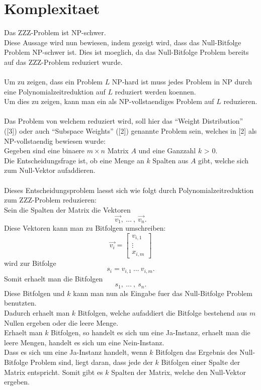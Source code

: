 \documentclass[a4paper,10pt,ngerman]{scrartcl}
\begin{document}
\section{Komplexitaet}
Das ZZZ-Problem ist NP-schwer.\\
Diese Aussage wird nun bewiesen, indem gezeigt wird, dass das Null-Bitfolge Problem NP-schwer ist. Dies ist moeglich, da das Null-Bitfolge Problem bereits auf das ZZZ-Problem reduziert wurde.
\\
\\Um zu zeigen, dass ein Problem $L$ NP-hard ist muss jedes Problem in NP durch eine Polynomialzeitreduktion auf $L$ reduziert werden koennen.
\\Um dies zu zeigen, kann man ein als NP-vollstaendiges Problem auf $L$ reduzieren.\\
\\
Das Problem von welchem reduziert wird, soll hier das "`Weight Distribution"' ([3]) oder auch "`Subspace Weights"' ([2]) genannte Problem sein, welches in [2] als NP-vollstaendig bewiesen wurde:\\
Gegeben sind eine binaere $m \times n$  Matrix $A$ und eine Ganzzahl $k$ > 0.\\
Die Entscheidungsfrage ist, ob eine Menge an $k$ Spalten aus $A$ gibt, welche sich zum Null-Vektor aufaddieren.
\\\\
Dieses Entscheidungsproblem laesst sich wie folgt durch Polynomialzeitreduktion zum ZZZ-Problem reduzieren:\\
Sein die Spalten der Matrix die Vektoren
$$
\vec{v_1}, \ \dots \ , \ \vec{v_n}.
$$
Diese Vektoren kann man zu Bitfolgen umschreiben:
$$
\vec{v_i} = \begin{bmatrix}
           v_{i, 1} \\
           \vdots \\
           x_{i, m}
         \end{bmatrix} 
$$
wird zur Bitfolge 
$$
s_i = v_{i, 1} \ \dots \ v_{i, m}.
$$
Somit erhaelt man die Bitfolgen
$$
s_1, \ \dots \ , \ s_n.
$$
Diese Bitfolgen und $k$ kann man nun als Eingabe fuer das Null-Bitfolge Problem benutzten. 
\\
Dadurch erhaelt man $k$ Bitfolgen, welche aufaddiert die Bitfolge bestehend aus $m$ Nullen ergeben oder die leere Menge.
\\Erhaelt man $k$ Bitfolgen, so handelt es sich um eine Ja-Instanz, erhaelt man die leere Mengen, handelt es sich um eine Nein-Instanz.
\\Dass es sich um eine Ja-Instanz handelt, wenn $k$ Bitfolgen das Ergebnis des Null-Bitfolge Problem sind, liegt daran, dass jede der $k$ Bitfolgen einer Spalte der Matrix entspricht. Somit gibt es $k$ Spalten der Matrix, welche den Null-Vektor ergeben.
\end{document}
